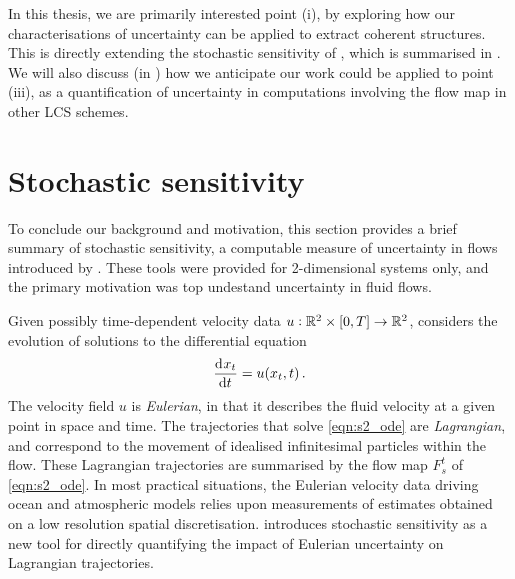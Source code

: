 In this thesis, we are primarily interested point (i), by exploring how our characterisations of uncertainty can be applied to extract coherent structures.
This is directly extending the stochastic sensitivity of \citet{Balasuriya_2020_StochasticSensitivityComputable}, which is summarised in .
We will also discuss (in ) how we anticipate our work could be applied to point (iii), as a quantification of uncertainty in computations involving the flow map in other LCS schemes.






\section{Stochastic sensitivity}\label{sec:s2_summ}
To conclude our background and motivation, this section provides a brief summary of stochastic sensitivity, a computable measure of uncertainty in flows introduced by \citet{Balasuriya_2020_StochasticSensitivityComputable}.
These tools were provided for 2-dimensional systems only, and the primary motivation was top undestand uncertainty in fluid flows.

Given possibly time-dependent velocity data \(u: \mathbb{R}^2 \times [0,T] \to \mathbb{R}^2\), \citet{Balasuriya_2020_StochasticSensitivityComputable} considers the evolution of solutions to the differential equation
\begin{equation}\label{eqn:s2_ode}
	\dod{x_t}{t} = u\!\left(x_t, t\right).
\end{equation}
The velocity field \(u\) is \emph{Eulerian}, in that it describes the fluid velocity at a given point in space and time.
The trajectories that solve \cref{eqn:s2_ode} are \emph{Lagrangian}, and correspond to the movement of idealised infinitesimal particles within the flow.
These Lagrangian trajectories are summarised by the flow map \(F_s^t\) of \cref{eqn:s2_ode}.
In most practical situations, the Eulerian velocity data driving ocean and atmospheric models relies upon measurements of estimates obtained on a low resolution spatial discretisation.
\citet{Balasuriya_2020_StochasticSensitivityComputable} introduces stochastic sensitivity as a new tool for directly quantifying the impact of Eulerian uncertainty on Lagrangian trajectories.

